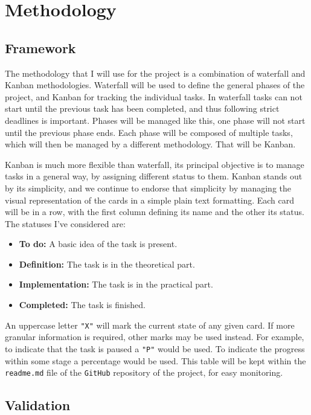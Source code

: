 \section{Methodology}

\subsection{Framework}

The methodology that I will use for the project is a combination of waterfall and Kanban methodologies. Waterfall will be used to define the general phases of the project, and Kanban for tracking the individual tasks. In waterfall tasks can not start until the previous task has been completed, and thus following strict deadlines is important. Phases will be managed like this, one phase will not start until the previous phase ends. Each phase will be composed of multiple tasks, which will then be managed by a different methodology. That will be Kanban.

Kanban is much more flexible than waterfall, its principal objective is to manage tasks in a general way, by assigning different status to them. Kanban stands out by its simplicity, and we continue to endorse that simplicity by managing the visual representation of the cards in a simple plain text formatting. Each card will be in a row, with the first column defining its name and the other its status. The statuses I've considered are:

\begin{itemize}
    \item \textbf{To do:} A basic idea of the task is present.
    \item \textbf{Definition:} The task is in the theoretical part.
    \item \textbf{Implementation:} The task is in the practical part.
    \item \textbf{Completed:} The task is finished.
\end{itemize}

An uppercase letter \texttt{"X"} will mark the current state of any given card. If more granular information is required, other marks may be used instead. For example, to indicate that the task is paused a \texttt{"P"} would be used. To indicate the progress within some stage a percentage would be used. This table will be kept within the \texttt{readme.md} file of the \texttt{GitHub} repository of the project, for easy monitoring.

\subsection{Validation}

